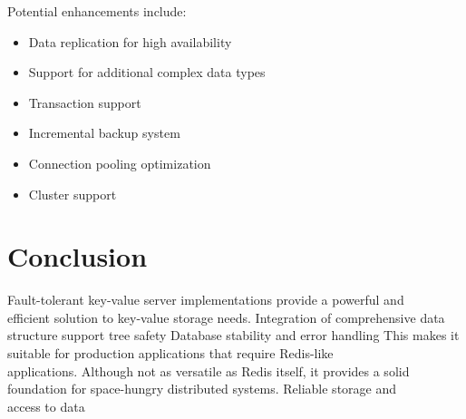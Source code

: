 \documentclass[11pt]{article}
\begin{document}
Potential enhancements include:
\begin{itemize}
    \item Data replication for high availability
    \item Support for additional complex data types
    \item Transaction support
    \item Incremental backup system
    \item Connection pooling optimization
    \item Cluster support
\end{itemize}

\section{Conclusion}
Fault-tolerant key-value server implementations provide a powerful and  \\efficient solution to key-value storage needs. Integration of comprehensive data structure support tree safety Database stability and error handling This makes it suitable for production applications that require Redis-like  \\applications. Although not as versatile as Redis itself, it provides a solid foundation for space-hungry distributed systems. Reliable storage and  \\access to data
\end{document}
